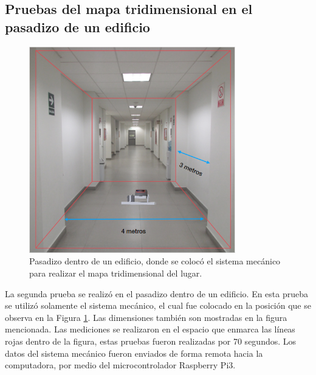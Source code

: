 \subsection{Pruebas del mapa tridimensional en el pasadizo de un edificio}
\begin{figure}
  \centering \footnotesize
  \includegraphics[width=0.80\textwidth]{images/esan_lidar.PNG}
  \captionsetup{font=footnotesize}
  \caption{Pasadizo dentro de un edificio, donde se colocó el sistema mecánico para 
  realizar el mapa tridimensional del lugar.}
  \label{fig:pasadizoEsan}
\end{figure}

La segunda prueba se realizó en el pasadizo dentro de un edificio. En esta prueba 
se utilizó solamente el sistema mecánico, el cual fue colocado en la posición que 
se observa en la Figura \ref{fig:pasadizoEsan}. Las dimensiones también son 
mostradas en la figura mencionada. Las mediciones se realizaron en el espacio 
que enmarca las líneas rojas dentro de la figura, estas pruebas fueron realizadas
por 70 segundos. Los datos del sistema mecánico fueron enviados de forma remota hacia 
la computadora, por medio del microcontrolador Raspberry Pi3.




